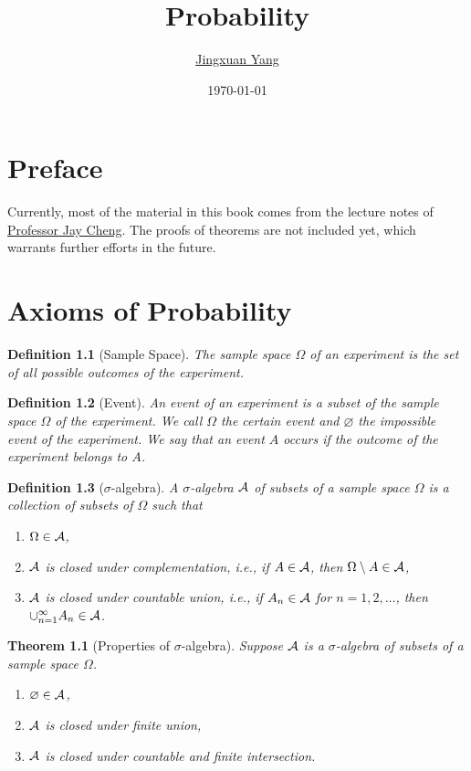 \documentclass[openany,12pt]{book}
\title{\Huge\textbf{Probability}}
\author{\href{https://www.jingxuanyang.com/}{Jingxuan Yang}}
\date{\today}
\newtheorem{theorem}{Theorem}[chapter]
\newtheorem{definition}{Definition}[chapter]
\begin{document}
\frontmatter

\maketitle

\tableofcontents

\chapter*{Preface}

Currently, most of the material in this book comes from the lecture notes of \href{https://www.ee.nthu.edu.tw/jcheng/}{Professor Jay Cheng}. The proofs of theorems are not included yet, which warrants further efforts in the future.

\mainmatter

\chapter{Axioms of Probability}

\begin{definition}[Sample Space]
  The sample space $\Omega$ of an experiment is the set of all possible outcomes of the experiment.
\end{definition}

\begin{definition}[Event]
  An event of an experiment is a subset of the sample space $\Omega$ of the experiment. We call $\Omega$ the certain event and $\varnothing$ the impossible event of the experiment. We say that an event $A$ occurs if the outcome of the experiment belongs to $A$.
\end{definition}

\begin{definition}[$\sigma$-algebra]
  A $\sigma$-algebra $\mathcal{A}$ of subsets of a sample space $\Omega$ is a collection of subsets of $\Omega$ such that
  \begin{enumerate}
    \item $\Omega\in\mathcal{A}$,
    \item $\mathcal{A}$ is closed under complementation, i.e., if $A\in\mathcal{A}$, then $\Omega\setminus A\in\mathcal{A}$,
    \item $\mathcal{A}$ is closed under countable union, i.e., if $A_n\in\mathcal{A}$ for $n=1,2,\dots$, then $\cup_{n=1}^\infty A_n \in\mathcal{A}$.
  \end{enumerate}
\end{definition}

\begin{theorem}[Properties of $\sigma$-algebra]
  Suppose $\mathcal{A}$ is a $\sigma$-algebra of subsets of a sample space $\Omega$.
  \begin{enumerate}
    \item $\varnothing\in\mathcal{A}$,
    \item $\mathcal{A}$ is closed under finite union,
    \item $\mathcal{A}$ is closed under countable and finite intersection.
  \end{enumerate}
\end{theorem}
\end{document}
